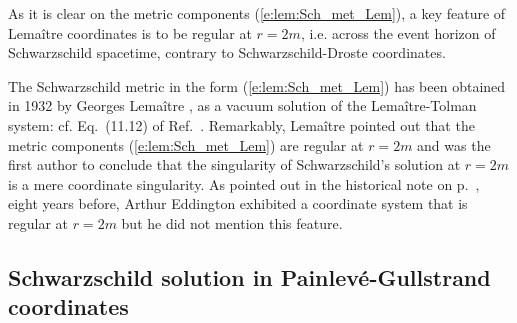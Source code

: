 As it is clear on the metric components (\ref{e:lem:Sch_met_Lem}),
a key feature of Lemaître coordinates is to be regular at $r=2m$, i.e.
across the event horizon of Schwarzschild spacetime, contrary to
Schwarzschild-Droste coordinates.

\begin{hist}
The Schwarzschild metric in the form (\ref{e:lem:Sch_met_Lem}) has
been obtained in 1932 by Georges Lemaître \cite{Lemai32},
as a vacuum solution of the Lemaître-Tolman system: cf. Eq.~(11.12) of Ref.~\cite{Lemai32}.
Remarkably, Lemaître pointed out that the metric components (\ref{e:lem:Sch_met_Lem}) are
regular at $r=2m$ and was the first author to conclude that the singularity of
Schwarzschild's solution at $r=2m$ is a mere coordinate singularity.
As pointed out in the historical note on p.~\pageref{n:sch:Eddington_coord}, eight years before,
Arthur Eddington \cite{Eddin1924} exhibited a
coordinate system that is regular at $r=2m$ but he
did not mention this feature.
\end{hist}

\subsection{Schwarzschild solution in Painlevé-Gullstrand coordinates}
\label{s:lem:PG}

